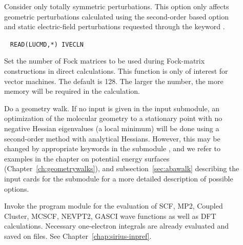 \begin{description}

\item[] Consider only totally symmetric
perturbations.
This option only affects geometric perturbations calculated using the
second-order based  option and static
electric-field perturbations requested through the keyword .

\item[]\verb| |
\newline
\verb|READ(LUCMD,*) IVECLN|

Set the number of Fock matrices to be used during Fock-matrix constructions in 
direct calculations. This function is only of interest for vector machines.
The default is 128. The larger the number, the more memory will be required 
in the calculation.

\item[] 
Do a geometry walk. If no
input is given in the
 input submodule, an optimization of the molecular
geometry to a stationary point with no
negative Hessian eigenvalues (a
local minimum) will be done using a second-order method with
analytical Hessians. However, this may be changed by appropriate
keywords in the submodule , and we refer to examples in
the chapter on potential energy surfaces
(Chapter~\ref{ch:geometrywalks}), and subsection~\ref{sec:abawalk}
describing the input cards for the  submodule for a more
detailed description of possible options.

\item[]
Invoke the {\sir} program module for the evaluation of SCF, MP2, Coupled
Cluster, MCSCF, NEVPT2, GASCI wave functions as well as DFT calculations.
Necessary one-electron integrals are already evaluated and saved on files.
See Chapter~\ref{chap:sirius-inpref}. 
\end{description}

%

